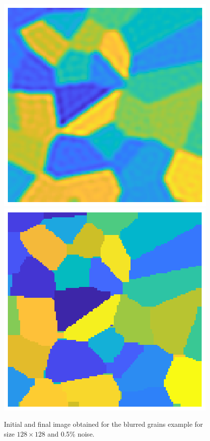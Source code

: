 \begin{figure}[htbp]
\begin{center}
\includegraphics{figures/grains_blurring_initial}\includegraphics{figures/grains_blurring_final}
\caption{Initial and final image obtained for the blurred grains example for size $128 \times 128$ and 0.5\% noise.}
\label{fig:grains_blurring_initial_and_final}
\end{center}
\end{figure}

